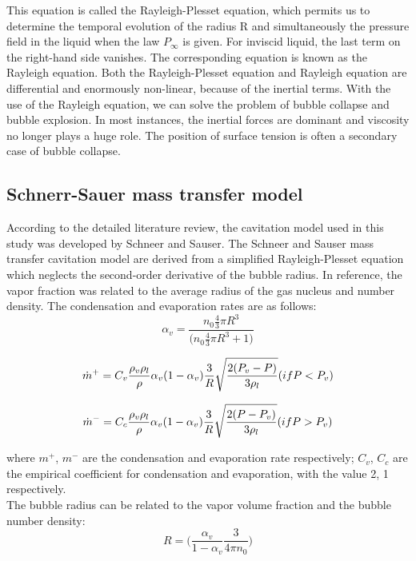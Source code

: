 This equation is called the Rayleigh-Plesset equation, which permits
us to determine the temporal evolution of the radius R and
simultaneously the pressure field in the liquid when the law
$P_{\infty}$ is given. For inviscid liquid, the last term on the
right-hand side vanishes. The corresponding equation is known as the
Rayleigh equation.  Both the Rayleigh-Plesset equation and Rayleigh
equation are differential and enormously non-linear, because of the
inertial terms. With the use of the Rayleigh equation, we can solve
the problem of bubble collapse and bubble explosion.  In most
instances, the inertial forces are dominant and viscosity  no
longer plays a huge role. The position of surface tension is often a
secondary case of bubble collapse.

\subsection{Schnerr-Sauer mass transfer model}
According to the detailed literature review, the cavitation model used
in this study was developed by Schneer and Sauser. The Schneer and
Sauser mass transfer cavitation model are derived from a simplified
Rayleigh-Plesset equation which neglects the second-order derivative
of the bubble radius. In reference\cite{Zhao2021, Hidalgo2014}, the
vapor fraction was related to the average radius of the gas nucleus
and number density.  The condensation and evaporation rates are as
follows:
\begin{equation}
{{\alpha}_v}=\frac{{{n}_0}{\frac{4}{3}}\pi{{R}^3}}{\Bigg({n_0}{\frac{4}{3}}\pi{R^3}+1 \Bigg)}
\end{equation}

\begin{equation}
{{\dot m}^+}={C_v}{\frac{{{\rho}_v}{\rho}_l}{\rho}}{{\alpha}_v}{(1-{\alpha}_v)}{\frac{3}{R}}{\sqrt{\frac{2({P_v}-{P})}{3{\rho}_l}}} \\     
({if P<P_v})
\end{equation}

\begin{equation}
 {{\dot{m}}^-}={C_c}{\frac{{{\rho}_v}{\rho}_l}{\rho}}{{\alpha}_v}{(1-{\alpha}_v)}{\frac{3}{R}}{\sqrt{\frac{2({P}-{P_v})}{3{\rho}_l}}}
 \\ ({if P>P_v})
\end{equation}

where ${m}^+$, ${m}^-$ are the condensation and evaporation rate
respectively; $C_v$, $C_c$ are the empirical coefficient for
condensation and evaporation, with the value 2, 1 respectively.\\ The
bubble radius can be related to the vapor volume fraction and the
bubble number density:
\begin{equation}
 R=\Bigg({\frac{{{\alpha}_v}}{1-{{\alpha}_v}}}{\frac{3}{4{\pi}{n_0}}}\Bigg)
\end{equation}

